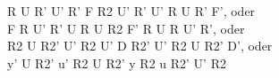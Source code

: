 R U R' U' R' F R2 U' R' U' R U R' F', oder\\
F R U' R' U R U R2 F' R U R U' R', oder\\
R2 U R2' U' R2 U' D R2' U' R2 U R2' D', oder\\
y' U R2' u' R2 U R2' y R2 u R2' U' R2\\
